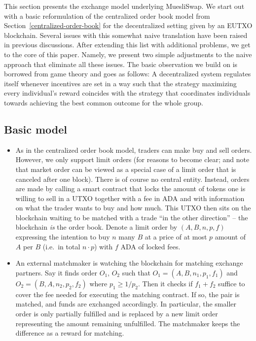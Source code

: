 \documentclass[11pt]{article}
\begin{document}
This section presents the exchange model underlying MuesliSwap. We start out with a basic reformulation of the centralized order book model from Section~\ref{centralized-order-book} for the decentralized setting given by an EUTXO blockchain. Several issues with this somewhat naive translation have been raised in previous discussions. After extending this list with additional problems, we get to the core of this paper. Namely, we present two simple adjustments to the naive approach that eliminate all these issues. The basic observation we build on is borrowed from game theory and goes as follows: A decentralized system regulates itself whenever incentives are set in a way such that the strategy maximizing every individual's reward coincides with the strategy that coordinates individuals towards achieving the best common outcome for the whole group.

\subsection{Basic model}

\begin{itemize}
    \item As in the centralized order book model, traders can make buy and sell orders. However, we only support limit orders (for reasons to become clear; and note that market order can be viewed as a special case of a limit order that is canceled after one block). There is of course no central entity. Instead, orders are made by calling a smart contract that locks the amount of tokens one is willing to sell in a UTXO together with a fee in ADA and with information on what the trader wants to buy and how much. This UTXO then sits on the blockchain waiting to be matched with a trade ``in the other direction'' -- the blockchain \emph{is} the order book. Denote a limit order by $(A,B,n,p,f)$ expressing the intention to buy $n$ many $B$ at a price of at most $p$ amount of $A$ per $B$ (i.e.\ in total $n \cdot p$) with $f$ ADA of locked fees.
    \item An external matchmaker is watching the blockchain for matching exchange partners. Say it finds order $O_1$, $O_2$ such that $O_1=(A,B,n_1,p_1,f_1)$ and $O_2=(B,A,n_2,p_2,f_2)$ where $p_1 \geq 1/p_2$. Then it checks if $f_1+f_2$ suffice to cover the fee needed for executing the matching contract. If so, the pair is matched, and funds are exchanged accordingly. In particular, the smaller order is only partially fulfilled and is replaced by a new limit order representing the amount remaining unfulfilled. The matchmaker keeps the difference as a reward for matching.
\end{itemize}
\end{document}

